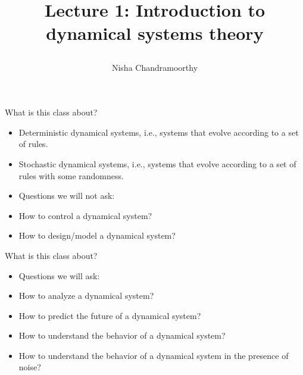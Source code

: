 \documentclass[final]{beamer}
\title{\begin{huge}{Lecture 1: Introduction to dynamical systems theory}\end{huge}} %
\author{Nisha Chandramoorthy} %
\begin{document}
\frame{\titlepage}

\begin{frame}{What is this class about?}
	\begin{itemize}
	\item Deterministic dynamical systems, i.e., systems that evolve according to a set of rules.
	\pause 
	\item Stochastic dynamical systems, i.e., systems that evolve according to a set of rules with some randomness.
	\pause
\item Questions we will not ask:
	\pause 
	\item How to control a dynamical system?
	\item How to design/model a dynamical system?
	\end{itemize}
\end{frame}
\begin{frame}{What is this class about?}
	\begin{itemize}
		\item Questions we will ask:
		\pause
		\item How to analyze a dynamical system?
		\pause
		\item How to predict the future of a dynamical system?
		\pause
		\item How to understand the behavior of a dynamical system?
		\pause
		\item How to understand the behavior of a dynamical system in the presence of noise?
	\end{itemize}
\end{frame}
\end{document}

